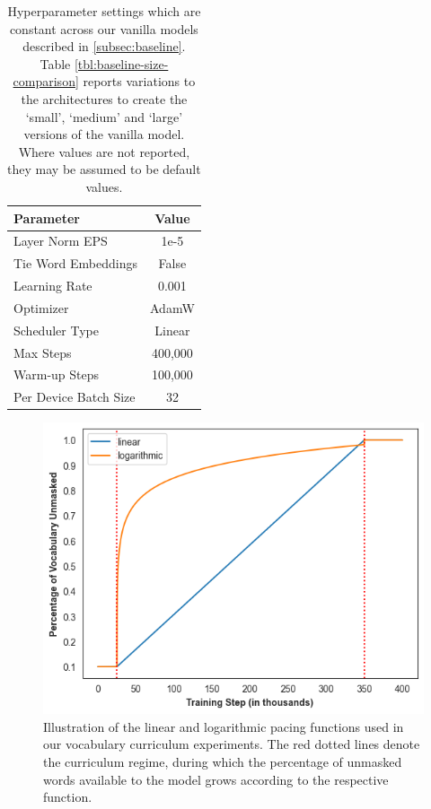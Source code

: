 \begin{table}
    \centering
    \small
    \begin{tabular}{lc}
    \toprule
         Parameter& Value\\
    \midrule
         Layer Norm EPS& 1e-5 \\
         Tie Word Embeddings & False \\
         Learning Rate & 0.001 \\
         Optimizer & AdamW \\
         Scheduler Type & Linear\\
         Max Steps & 400,000 \\
         Warm-up Steps & 100,000\\
         Per Device Batch Size & 32 \\
    \bottomrule
    \end{tabular}
    \caption{Hyperparameter settings which are constant across our vanilla models described in \ref{subsec:baseline}. Table \ref{tbl:baseline-size-comparison} reports variations to the architectures to create the `small', `medium' and `large' versions of the vanilla model. Where values are not reported, they may be assumed to be default values.}
    \label{tbl:baseline_hyperparams}
\end{table}
\begin{figure}
\centering
\includegraphics[width=.75\textwidth]{chapters/climb/figures/pacing_fns.png}
    \caption{Illustration of the linear and logarithmic pacing functions used in our vocabulary curriculum experiments. The red dotted lines denote the curriculum regime, during which the percentage of unmasked words available to the model grows according to the respective function.}
    \label{fig:pacing_fn}
\end{figure}
